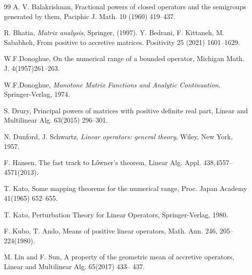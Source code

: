 \documentclass[reqno]{amsart}
\theoremstyle{definition}
\theoremstyle{remark}
\begin{document}
\begin{thebibliography}{99}
\baselineskip=3mm
A. V. Balakrishnan, Fractional powers of closed operators and the semigroups generated by them, 
Paciphic J. Math. 10 (1960) 419--437.

R. Bhatia, {\it Matrix analysis}, Springer, (1997). 
Y. Bedrani, F. Kittaneh, M. Sababheh, From positive to accretive matrices.
Positivity 25 (2021) 1601--1629.


W.\;F.\;Donoghue, On the numerical range of a bounded operator, Michigan Math. J. 
4(1957)261--263. 

W.\;F.\;Donoghue, {\it Monotone Matrix Functions and Analytic Continuation}.
 Springer-Verlag, 1974.   

S. Drury, Principal powers of matrices with positive definite real part, Linear and Multilinear 
Alg. 63(2015) 296--301.

N. Dunford, J. Schwartz, {\it Linear operators: general theory}, Wiley, New York, 1957.

F. Hansen, The fast track to L\H{o}wner's theorem, Linear Alg. Appl. 438,4557--4571(2013).



T. Kato, Some mapping theorems for the numerical range, 
Proc. Japan Academy 41(1965) 652--655.

T. Kato, Perturbation Theory for Linear Operators, Springer-Verlag, 1980.
%

 F. Kubo, T. Ando,  Means of positive linear operators,
Math. Ann. 246,  205--224(1980).

M. Lin and F. Sun, A property of the geometric mean of accretive operators, Linear and Multilinear 
 Alg. 65(2017) 433-- 437.



\end{thebibliography}
\end{document}
